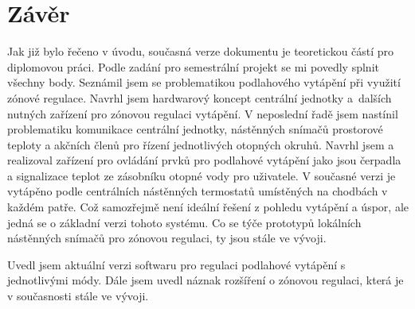 \chapter{Závěr}
Jak již bylo řečeno v úvodu, současná verze dokumentu je teoretickou částí pro diplomovou práci. Podle zadání pro semestrální projekt se mi povedly splnit všechny body. Seznámil jsem se problematikou podlahového vytápění při využití zónové regulace. Navrhl jsem hardwarový koncept centrální jednotky a~dalších nutných zařízení pro zónovou regulaci vytápění. V  neposlední řadě jsem nastínil problematiku komunikace centrální jednotky, nástěnných snímačů prostorové teploty a akčních členů pro řízení jednotlivých otopných okruhů. Navrhl jsem a realizoval zařízení pro ovládání prvků pro podlahové vytápění jako jsou čerpadla a signalizace teplot ze zásobníku otopné vody pro uživatele. V současné verzi je vytápěno podle centrálních nástěnných termostatů umístěných na chodbách v každém patře. Což samozřejmě není ideální řešení z pohledu vytápění a úspor, ale jedná se o základní verzi tohoto systému. Co se týče prototypů lokálních nástěnných snímačů pro zónovou regulaci, ty jsou stále ve vývoji.

Uvedl jsem aktuální verzi softwaru pro regulaci podlahové vytápění s jednotlivými módy. Dále jsem uvedl náznak rozšíření o zónovou regulaci, která je v současnosti stále ve vývoji.
